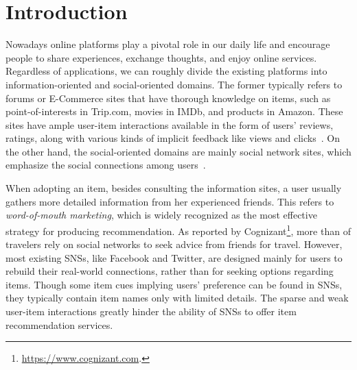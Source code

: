 \documentclass[sigconf]{acmart}
\begin{document}
\vspace{-5pt}

 \vspace{-5pt}
\maketitle

\section{Introduction}
Nowadays online platforms play a pivotal role in our daily life and encourage people to share experiences, exchange thoughts, and enjoy online services.
Regardless of applications, we can roughly divide the existing platforms into information-oriented and social-oriented domains.
The former typically refers to forums or E-Commerce sites that have thorough knowledge on items, such as point-of-interests in Trip.com, movies in IMDb, and products in Amazon. These sites have ample user-item interactions available in the form of users' reviews, ratings, along with various kinds of implicit feedback like views and clicks~\cite{iCD}.
On the other hand, the social-oriented domains are mainly social network sites, which emphasize the social connections among users~\cite{SNE}.

When adopting an item, besides consulting the information sites, a user usually gathers more detailed information from her experienced friends. This refers to \emph{word-of-mouth marketing}, which is widely recognized as the most effective strategy for producing recommendation.
As reported by Cognizant\footnote{\url{https://www.cognizant.com}.}, more than  of travelers rely on social networks to seek advice from friends for travel.
However, most existing SNSs, like Facebook and Twitter, are designed mainly for users to rebuild their real-world connections, rather than for seeking options regarding items.
Though some item cues implying users' preference can be found in SNSs, they typically contain item names only with limited details.
The sparse and weak user-item interactions greatly hinder the ability of SNSs to offer item recommendation services.
\end{document}

